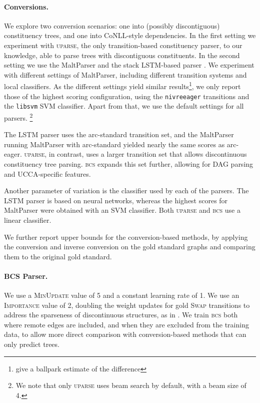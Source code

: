 \documentclass[11pt]{article}
\newcommand{\oa}[1]{\footnote{\color{red} #1}}
\begin{document}

\paragraph{Conversions.}
We explore two conversion scenarios: one into (possibly discontiguous) constituency trees,
and one into CoNLL-style dependencies. In the first setting we experiment with \textsc{uparse},
the only transition-based constituency parser, to our knowledge, able to parse trees with
discontiguous constituents.
In the second setting we use the MaltParser \cite{nivre2007maltparser} and the stack LSTM-based parser \cite{dyer2015transition}.
We experiment with different settings of MaltParser, including
different transition systems and local classifiers. As the different
settings yield similar results\oa{give a ballpark estimate of the difference},
we only report those of the highest
scoring configuration, using the \texttt{nivreeager} transitions
and the \texttt{libsvm} SVM classifier.
Apart from that, we use the default settings for all parsers.
\footnote{We note that only \textsc{uparse} uses beam search by default,
  with a beam size of 4.}

The LSTM parser uses the arc-standard transition set, and the MaltParser
running MaltParser with arc-standard yielded nearly the same
scores as arc-eager. \textsc{uparse}, in contrast, uses a larger transition
set that allows discontinuous constituency tree parsing.
\textsc{bcs} expands this set further, allowing for DAG parsing
and UCCA-specific features.

Another parameter of variation is the classifier used by each of the parsers.
The LSTM parser is based on neural networks, whereas the highest scores for
MaltParser were obtained with an SVM classifier.
Both \textsc{uparse} and \textsc{bcs} use a linear classifier.


We further report upper bounds for the conversion-based methods, by applying
the conversion and inverse conversion on the gold standard graphs and comparing
them to the original gold standard.

\paragraph{\textsc{BCS} Parser.}
We use a \textsc{MinUpdate} value of 5 and a constant learning rate of 1.
We use an \textsc{Importance} value of 2, doubling the weight updates
for gold \textsc{Swap} transitions to address the sparseness
of discontinuous structures, as in \cite{maier2015discontinuous}.
We train \textsc{bcs} both where remote edges
are included, and when they are excluded from the training data, to allow
more direct comparison with conversion-based methods that can only
predict trees.
\end{document}
